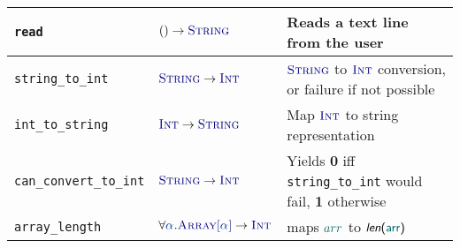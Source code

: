 \documentclass{article}
\newcommand{\Ty}[1]{\textcolor{dblue}{#1}}
\newcommand{\TString}{\Ty{\textsc{String}}}
\newcommand{\TInt}{\Ty{\textsc{Int}}}
\newcommand{\TArrayof}[1]{\Ty{\textsc{Array}[#1]}}
\newcommand{\tyva}[1][{}]{\textcolor{dbluez}{\ensuremath{\alpha_{#1}}}}
\newcommand{\Varray}[0]{\textcolor{dcyan}{arr}}
\newcommand{\Vint}[1]{{\textsf{\textcolor{dcyan}{\textbf{#1}}}}}
\newcommand{\arraylength}[1]{\textsf{\textit{len}(#1)}}
\newcommand{\failure}{\textcolor{dred}{failure}}
\newcommand{\fail}{\textcolor{dred}{fail}}
\begin{document}
\begin{tabular}{|l|l|p{5cm}|}
  \hline
    \texttt{read} & $() \to \TString$ & Reads a text line from the user \\
  \hline
    \texttt{string\_to\_int} & $\TString \to \TInt$ & $\TString$ to $\TInt$ conversion, or {\failure} if not possible \\
  \hline
    \texttt{int\_to\_string} & $\TInt \to \TString$ & Map $\TInt$ to string representation \\
  \hline
    \texttt{can\_convert\_to\_int} & $\TString \to \TInt$ & Yields \Vint{0} iff \texttt{string\_to\_int} would {\fail}, \Vint{1} otherwise \\
  \hline
    \texttt{array\_length} & $\forall \tyva . \TArrayof{\tyva} \to \TInt$ & maps $\Varray$ to $\arraylength{\Varray}$ \\
  \hline
\end{tabular}
\end{document}
